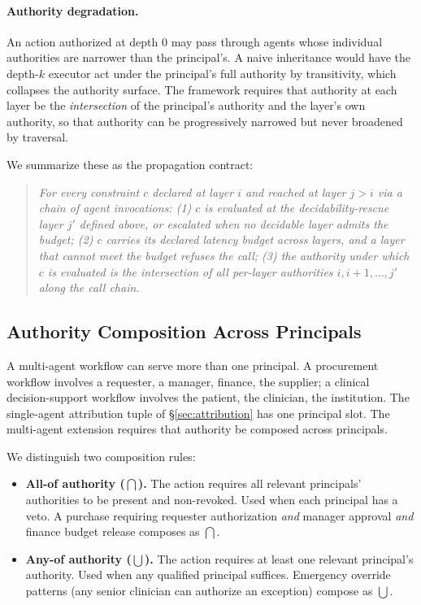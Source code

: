 \documentclass[11pt,a4paper]{article}
\theoremstyle{remark}
\begin{document}
\paragraph{Authority degradation.} An action authorized at depth 0 may pass through agents whose individual authorities are narrower than the principal's. A naive inheritance would have the depth-$k$ executor act under the principal's full authority by transitivity, which collapses the authority surface. The framework requires that authority at each layer be the \emph{intersection} of the principal's authority and the layer's own authority, so that authority can be progressively narrowed but never broadened by traversal.

We summarize these as the propagation contract:

\begin{quote}\itshape
For every constraint $c$ declared at layer $i$ and reached at layer $j > i$ via a chain of agent invocations: (1) $c$ is evaluated at the decidability-rescue layer $j'$ defined above, or escalated when no decidable layer admits the budget; (2) $c$ carries its declared latency budget across layers, and a layer that cannot meet the budget refuses the call; (3) the authority under which $c$ is evaluated is the intersection of all per-layer authorities $i, i+1, \ldots, j'$ along the call chain.
\end{quote}

\subsection{Authority Composition Across Principals}\label{sec:multi-auth}

A multi-agent workflow can serve more than one principal. A procurement workflow involves a requester, a manager, finance, the supplier; a clinical decision-support workflow involves the patient, the clinician, the institution. The single-agent attribution tuple of \S\ref{sec:attribution} has one principal slot. The multi-agent extension requires that authority be composed across principals.

We distinguish two composition rules:

\begin{itemize}[leftmargin=2em,topsep=0.3em,itemsep=0.3em]
\item \textbf{All-of authority ($\bigcap$).} The action requires all relevant principals' authorities to be present and non-revoked. Used when each principal has a veto. A purchase requiring requester authorization \emph{and} manager approval \emph{and} finance budget release composes as $\bigcap$.
\item \textbf{Any-of authority ($\bigcup$).} The action requires at least one relevant principal's authority. Used when any qualified principal suffices. Emergency override patterns (any senior clinician can authorize an exception) compose as $\bigcup$.
\end{itemize}
\end{document}
